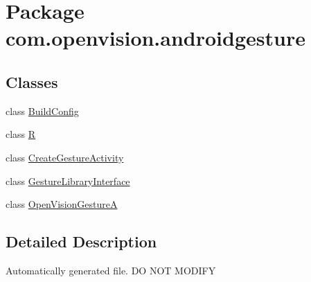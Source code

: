 \hypertarget{namespacecom_1_1openvision_1_1androidgesture}{\section{\-Package com.\-openvision.\-androidgesture}
\label{namespacecom_1_1openvision_1_1androidgesture}
}
\subsection*{\-Classes}
\begin{DoxyCompactItemize}
\item 
class \hyperlink{classcom_1_1openvision_1_1androidgesture_1_1BuildConfig}{\-Build\-Config}
\item 
class \hyperlink{classcom_1_1openvision_1_1androidgesture_1_1R}{\-R}
\item 
class \hyperlink{classcom_1_1openvision_1_1androidgesture_1_1CreateGestureActivity}{\-Create\-Gesture\-Activity}
\item 
class \hyperlink{classcom_1_1openvision_1_1androidgesture_1_1GestureLibraryInterface}{\-Gesture\-Library\-Interface}
\item 
class \hyperlink{classcom_1_1openvision_1_1androidgesture_1_1OpenVisionGestureA}{\-Open\-Vision\-Gesture\-A}
\end{DoxyCompactItemize}


\subsection{\-Detailed \-Description}
\-Automatically generated file. \-D\-O \-N\-O\-T \-M\-O\-D\-I\-F\-Y 